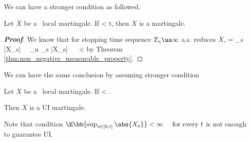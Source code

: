 We can have a stronger condition as followed.

\begin{corollary}\label{cor:local_martingale_expected_sup_compact_martingale}
Let $X$ be a \cadlag\ local martingale. If
\be
\E{} < \infty\quad{}t,
\ee
then $X$ is a martingale.
\end{corollary}

%

\begin{proof}[\bf Proof]
We know that for stopping time sequence $T_n \ua \infty$ a.s. reduces $X$,
\be
{} =  \leq \sup_{s\in[0,t]} |X_s|  \ \ra\ \sup_{n} \leq \sup_{s\in[0,t]} |X_s| \ \ra\  \E{} \leq  \E{} < \infty
\ee
by Theorem \ref{thm:non_negative_measurable_property}.
\end{proof}

We can have the same conclusion by assuming stronger condition

\begin{corollary}\label{cor:local_martingale_expected_sup_martingale}
Let $X$ be a \cadlag\ local martingale. If
\be
\E{} < \infty.
\ee

Then $X$ is a UI martingale.
\end{corollary}

\begin{remark}
Note that condition $\E\bb{\sup_{s\in[0,t]} \abs{X_s}} < \infty\quad\text{ for every }t$ is not enough to guarantee UI.
\end{remark}


